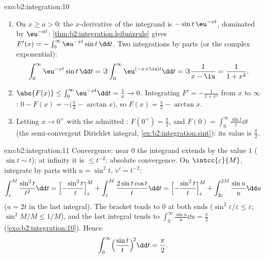 \begin{solution}{exo:b2:integration:10}
\begin{enumerate}
  \item On $x \geq a > 0$: the $x$-derivative of the integrand is
        $-\sin t\,\eu^{-xt}$, dominated by $\eu^{-at}$:
        \cref{thm:b2:integration:leibnizrule} gives $F'(x) =
        -\int_0^\infty \eu^{-xt}\sin t\,\dd t$. Two integrations by
        parts (or the complex exponential):
        \[
        \int_0^\infty \eu^{-xt}\sin t\,\dd t
        = \Im \int_0^\infty \eu^{(-x+\iu)t}\dd t
        = \Im\frac{1}{x - \iu} = \frac{1}{1 + x^2} .
        \]
  \item $\abs{F(x)} \leq \int_0^\infty \eu^{-xt}\dd t = \frac1x \to
        0$. Integrating $F' = -\frac{1}{1+x^2}$ from $x$ to
        $\infty$: $0 - F(x) = -\bigl(\frac\pi2 - \arctan x\bigr)$,
        so $F(x) = \frac\pi2 - \arctan x$.
  \item Letting $x \to 0^+$ with the admitted : $F(0^+) =
        \frac\pi2$, and $F(0) = \int_0^\infty \frac{\sin t}{t}\dd
        t$ (the semi-convergent Dirichlet integral,
        \cref{ex:b2:integration:sint}): its value is
        $\frac\pi2$.
\end{enumerate}
\end{solution}

\begin{solution}{exo:b2:integration:11}
Convergence: near $0$ the integrand extends  by the
value $1$ ($\sin t \sim t$); at infinity it is $\leq t^{-2}$:
absolute convergence. On $\intcc{\varepsilon}{M}$, integrate by
parts with $u = \sin^2 t$, $v' = t^{-2}$:
\[
\int_\varepsilon^M \frac{\sin^2 t}{t^2}\dd t
= \Bigl[-\frac{\sin^2 t}{t}\Bigr]_\varepsilon^M
+ \int_\varepsilon^M \frac{2\sin t\cos t}{t}\dd t
= \Bigl[-\frac{\sin^2 t}{t}\Bigr]_\varepsilon^M
+ \int_{2\varepsilon}^{2M} \frac{\sin u}{u}\dd u
\]
($u = 2t$ in the last integral). The bracket tends to $0$ at both
ends ($\sin^2\varepsilon/\varepsilon \leq \varepsilon$;
$\sin^2 M/M \leq 1/M$), and the last integral tends to
$\int_0^\infty \frac{\sin u}{u}\dd u = \frac\pi2$
(\cref{exo:b2:integration:10}). Hence
\[
\int_0^\infty \Bigl(\frac{\sin t}{t}\Bigr)^{\!2}\dd t
= \frac\pi2 .
\]
\end{solution}

